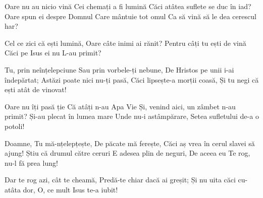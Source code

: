 \beginverse
Oare nu au nicio vină
Cei chemați a fi lumină
Căci atâtea suflete se duc în iad?
Oare spun ei despre Domnul
Care mântuie tot omul
Ca să vină să le dea cerescul har?
\endverse

\beginchorus
Cel ce zici că ești lumină,
Oare câte inimi ai rănit?
Pentru câți tu ești de vină
Căci pe Isus ei nu L-au primit?
\endchorus

\beginverse
Tu, prin neînțelepciune
Sau prin vorbele-ți nebune,
De Hristos pe unii i-ai îndepărtat;
Astăzi poate nici nu-ți pasă,
Căci lipsește-a morții coasă,
Și tu negi că ești atât de vinovat!
\endverse

\beginverse
Oare nu îți pasă ție
Că atâți n-au Apa Vie
Și, venind aici, un zâmbet n-au primit?
Și-au plecat în lumea mare
Unde nu-i astâmpărare,
Setea sufletului de-a o potoli!
\endverse

\beginverse
Doamne, Tu mă-nțelepțește,
De păcate mă ferește,
Căci aș vrea în cerul slavei să ajung!
Știu că drumul către ceruri
E adesea plin de neguri,
De aceea eu Te rog, nu-l fă prea lung!
\endverse

\beginchorus
Dar te rog azi, cât te cheamă,
Predă-te chiar dacă ai greșit;
Și nu uita căci cu-atâta dor,
O, ce mult Isus te-a iubit!
\endchorus
\endsong
